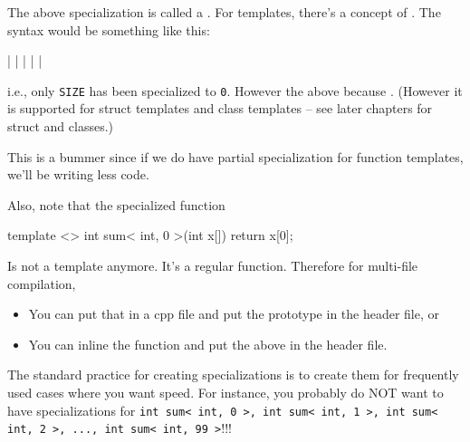
The above specialization is called a . For
templates, there's a concept of . The
syntax would be something like this:

\begin{consolethree}[escapeinside=||]
|
|
\EMPHASIZE{\{}|
    |
\EMPHASIZE{\}}|
\end{consolethree}

i.e., only \texttt{SIZE} has been specialized to \texttt{0}. However the above  because . (However it is supported for struct templates and class templates -- see later chapters for struct and classes.)

This is a bummer since if we do have partial specialization for function
templates, we'll be writing less code.

Also, note that the specialized function

\begin{consolethree}[escapeinside=||]
template <>
int sum< int, 0 >(int x[])
{
    return x[0];
}
\end{consolethree}

Is not a template anymore. It's a regular function. Therefore for multi-file compilation,

\begin{itemize}
\item You can put that in a cpp file and put the prototype in the header
  file, or
\item You can inline the function and put the above in the header file.
\end{itemize}

The standard practice for creating specializations is to create them for frequently used cases where you want speed. For instance, you probably do NOT want to have specializations for \verb!int sum< int, 0 >, int sum< int, 1 >, int sum< int, 2 >, ..., int sum< int, 99 >!!!!







